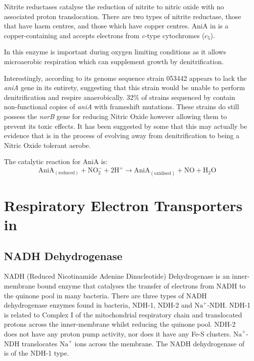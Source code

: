 Nitrite reductases catalyse the reduction of nitrite to nitric oxide with no associated proton translocation. There are two types of nitrite reductase, those that have haem centres, and those which have copper centres. AniA in \Nm{} is a copper-containing and accepts electrons from \textit{c}-type cytochromes ($c_5$).

In \Nm{} this enzyme is important during oxygen limiting conditions as it allows microaerobic respiration which can supplement growth by denitrification\cite{Rock2005}.

Interestingly, according to its genome sequence \Nm{} strain 053442 appears to lack the \textit{aniA} gene in its entirety, suggesting that this strain would be unable to perform denitrification and respire anaerobically\cite{Barth2009}.  32\% of \Nm{} strains sequenced by \citet{Barth2009} contain non-functional copies of \textit{aniA} with frameshift mutations. These strains do still possess the \textit{norB} gene for reducing Nitric Oxide however allowing them to prevent its toxic effects. It has been suggested by some that this may actually be evidence that \Nsm{} is in the process of evolving away from denitrification to being a Nitric Oxide tolerant aerobe\cite{Moir2011}.

The catalytic reaction for AniA is:
\begin{equation}
\mathrm{AniA}_{\mathrm{(reduced)}} + \mathrm{NO}_2^- + 2\mathrm{H}^+ \rightarrow \mathrm{AniA}_{\mathrm{(oxidised)}} + \mathrm{NO} + \mathrm{H}_2\mathrm{O}
\end{equation}

\section{Respiratory Electron Transporters in \Nm{}}
\subsection{NADH Dehydrogenase}
NADH (Reduced Nicotinamide Adenine Dinucleotide) Dehydrogenase is an inner-membrane bound enzyme that catalyses the transfer of electrons from NADH to the quinone pool in many bacteria. There are three types of NADH dehydrogenase enzymes found in bacteria, NDH-1, NDH-2 and $\mathrm{Na}^+$-NDH. NDH-1 is related to Complex I of the mitochondrial respiratory chain and translocated protons across the inner-membrane whilst reducing the quinone pool\cite{Weiss1991,Carroll2003,Friedrich2004}. NDH-2 does not have any proton pump activity, nor does it have any Fe-S clusters\cite{Yagi1991}. $\mathrm{Na}^+$-NDH translocates $\mathrm{Na}^+$ ions across the membrane\cite{Gemperli2002}. The NADH dehydrogenase of \Nm{} is of the NDH-1 type\cite{Deeudom2007}.

